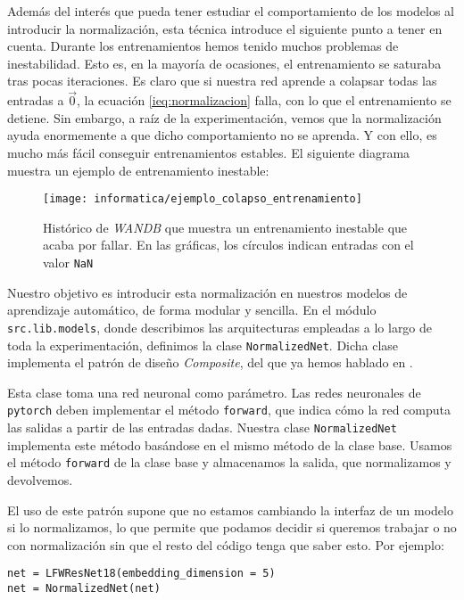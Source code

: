 Además del interés que pueda tener estudiar el comportamiento de los modelos al introducir la normalización, esta técnica introduce el siguiente punto a tener en cuenta. Durante los entrenamientos hemos tenido muchos problemas de inestabilidad. Esto es, en la mayoría de ocasiones, el entrenamiento se saturaba tras pocas iteraciones. Es claro que si nuestra red aprende a colapsar todas las entradas a $\vec{0}$, la ecuación \eqref{ieq:normalizacion} falla, con lo que el entrenamiento se detiene. Sin embargo, a raíz de la experimentación, vemos que la normalización ayuda enormemente a que dicho comportamiento no se aprenda. Y con ello, es mucho más fácil conseguir entrenamientos estables. El siguiente diagrama muestra un ejemplo de entrenamiento inestable:

\begin{figure}[H]
    \centering
    \texttt{[image: informatica/ejemplo\_colapso\_entrenamiento]}
    \caption{Histórico de \textit{WANDB} que muestra un entrenamiento inestable que acaba por fallar. En las gráficas, los círculos indican entradas con el valor \lstinline{NaN}}
\end{figure}

Nuestro objetivo es introducir esta normalización en nuestros modelos de aprendizaje automático, de forma modular y sencilla. En el módulo \lstinline{src.lib.models}, donde describimos las arquitecturas empleadas a lo largo de toda la experimentación, definimos la clase \lstinline{NormalizedNet}. Dicha clase implementa el patrón de diseño \textit{Composite}, del que ya hemos hablado en .

Esta clase toma una red neuronal como parámetro. Las redes neuronales de \lstinline{pytorch} deben implementar el método \lstinline{forward}, que indica cómo la red computa las salidas a partir de las entradas dadas. Nuestra clase \lstinline{NormalizedNet} implementa este método basándose en el mismo método de la clase base. Usamos el método \lstinline{forward} de la clase base y almacenamos la salida, que normalizamos y devolvemos.

El uso de este patrón supone que no estamos cambiando la interfaz de un modelo si lo normalizamos, lo que permite que podamos decidir si queremos trabajar o no con normalización sin que el resto del código tenga que saber esto. Por ejemplo:

\begin{lstlisting}[caption={Ejemplo de uso del patrón \textit{composite} para decidir si usamos o no normalización. El resto del código no tiene por qué saber este detalle de implementación, porque no cambiamos la interfaz de la clase}, captionpos=b]
net = LFWResNet18(embedding_dimension = 5)
net = NormalizedNet(net)
\end{lstlisting}

